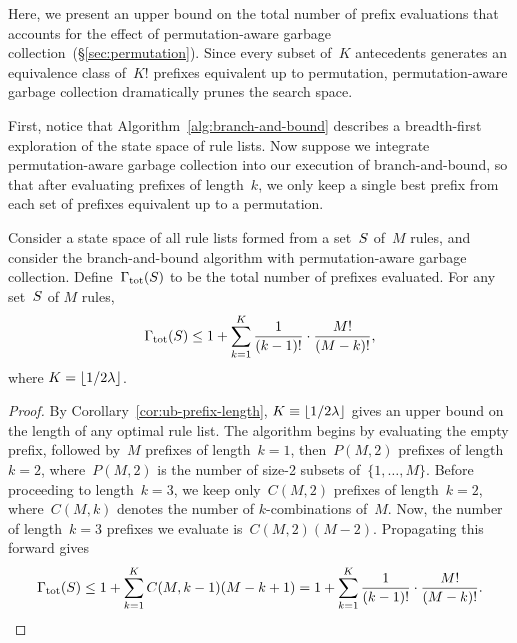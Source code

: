 Here, we present an upper bound on the total number of prefix
evaluations that accounts for the effect of permutation-aware
garbage collection~(\S\ref{sec:permutation}).
%
Since every subset of~$K$ antecedents generates an equivalence
class of~$K!$ prefixes equivalent up to permutation, permutation-aware
garbage collection dramatically prunes the search space.

First, notice that Algorithm~\ref{alg:branch-and-bound} describes a
breadth-first exploration of the state space of rule lists.
%
Now suppose we integrate permutation-aware garbage collection into
our execution of branch-and-bound, so that after evaluating
prefixes of length~$k$, we only keep a single best prefix
from each set of prefixes equivalent up to a permutation.

\begin{theorem}
%
Consider a state space of all rule lists formed from a set~$S$
of~$M$ rules, and consider the branch-and-bound algorithm with
permutation-aware garbage collection.
%
Define~${\Gamma_{\textnormal{tot}}}(S)$ to be the total number of prefixes evaluated.
%
For any set~$S$ of $M$ rules,
\begin{align}
\TotalRemaining(\RuleSet)
\le  1 + \sum_{k=1}^K \frac{1}{(k - 1)!} \cdot \frac{M!}{(M - k)!},
\end{align}
where ${K = \lfloor 1 / 2 {\lambda} \rfloor}$.
\end{theorem}

\begin{proof}
By Corollary~\ref{cor:ub-prefix-length},
${K \equiv \lfloor 1 / 2 {\lambda} \rfloor}$
gives an upper bound on the length of any optimal rule list.
%
The algorithm begins by evaluating the empty prefix,
followed by~$M$ prefixes of length~${k=1}$,
then~${P(M, 2)}$ prefixes of length~${k=2}$,
where~${P(M, 2)}$ is the number of size-2 subsets of~$\{1, \dots, M \}$.
%
Before proceeding to length~${k=3}$, we keep only~${C(M, 2)}$
prefixes of length~${k=2}$, where~${C(M, k)}$ denotes the
number of $k$-combinations of~$M$.
%
Now, the number of length~${k=3}$ prefixes we evaluate is~${C(M, 2) (M - 2)}$.
%
Propagating this forward gives
\begin{align}
\TotalRemaining(\RuleSet) \le 1 + \sum_{k=1}^K C(M, k-1) (M - k + 1)
= 1 + \sum_{k=1}^K \frac{1}{(k - 1)!} \cdot \frac{M!}{(M - k)!}.
\end{align}
\end{proof}

